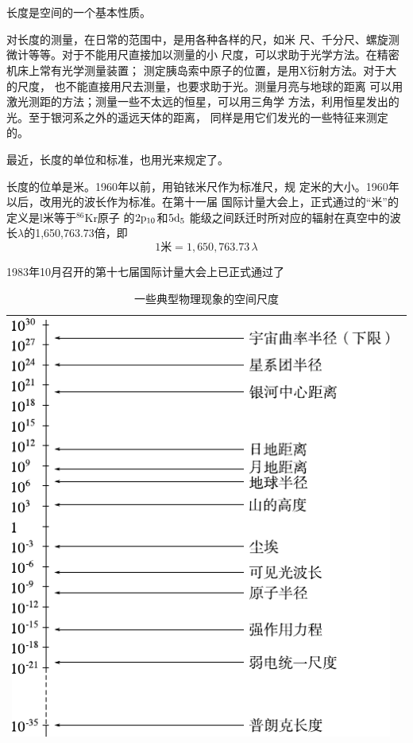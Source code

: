 \section[长度]{}\label{sec:01.03}

长度是空间的一个基本性质。

对长度的测量，在日常的范围中，是用各种各样的尺，如米
尺、千分尺、螺旋测微计等等。对于不能用尺直接加以测量的小
尺度，可以求助于光学方法。在精密机床上常有光学测量装置；
测定胰岛索中原子的位置，是用X衍射方法。对于大的尺度，
也不能直接用尺去测量，也要求助于光。测量月亮与地球的距离
可以用激光测距的方法；测量一些不太远的恒星，可以用三角学
方法，利用恒星发出的光。至于银河系之外的遥远天体的距离，
同样是用它们发光的一些特征来测定的。

最近，长度的单位和标准，也用光来规定了。

长度的位单是米。1960年以前，用铂铱米尺作为标准尺，规
定米的大小。1960年以后，改用光的波长作为标准。在第十一届
国际计量大会上，正式通过的“米”的定义是l米等于$^{86}$Kr原子
\clearpage\noindent
的$2\rm{p}_{10}$和$5\rm{d}_5$
能级之间跃迁时所对应的辐射在真空中的波长$\lambda$的1,650,763.73倍，即
\begin{equation*}
  1 \text{米} = 1,650,763.73 \, \lambda
\end{equation*}

1983年10月召开的第十七届国际计量大会上已正式通过了
\begin{table}[!h]
  \centering
  \caption{一些典型物理现象的空间尺度}
  \label{tab:01.03}
  \begin{tabular*}{\linewidth}{>{\centering}m{\linewidth}c}
    \toprule
    \includegraphics[width=0.8\linewidth]{figure/tab01.03} & \\
    \bottomrule
  \end{tabular*}
\end{table}
\clearpage

